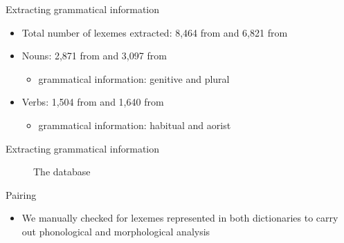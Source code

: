 \begin{frame}{Extracting grammatical information}
\begin{itemize}
    \item Total number of lexemes extracted: 8,464 from \citep{saidovaabusov2012} and 6,821 from \citep{alekseev2019}
    \item Nouns: 2,871 from \citep{saidovaabusov2012} and 3,097 from \citep{alekseev2019}
    \begin{itemize}
        \item grammatical information: genitive and plural
    \end{itemize}
    \item Verbs: 1,504 from \citep{saidovaabusov2012} and 1,640 from \citep{alekseev2019}
    \begin{itemize}
        \item grammatical information: habitual and aorist
    \end{itemize}
\end{itemize}
\end{frame}

\begin{frame}{Extracting grammatical information}
\begin{figure}[h]
\centering
{}
\caption{The database}
\end{figure}
\end{frame}

\begin{frame}{Pairing}
\begin{itemize}
    \item We manually checked for lexemes represented in both dictionaries to carry out phonological and morphological analysis 
\end{itemize}
\end{frame}

